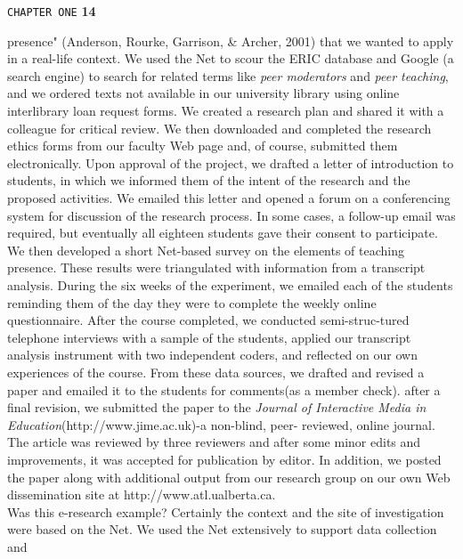 \documentclass{book}
\begin{document}
\begin{flushright}
\texttt{CHAPTER ONE}
\hspace*{0.5cm}
\textbf{14}
\end{flushright}
\vspace*{0.7cm}
presence" (Anderson, Rourke, Garrison, & Archer, 2001) that we wanted to apply in a
real-life context. We used the Net to scour the ERIC database and Google (a search
engine) to search for related terms like \emph{peer moderators} and \emph{peer teaching}, and we ordered
texts not available in our university library using online interlibrary loan request forms.
We created a research plan and shared it with a colleague for critical review. We then
downloaded and completed the research ethics forms from our faculty Web page and, of
course, submitted them electronically. Upon approval of the project, we drafted a letter of
introduction to students, in which we informed them of the intent of the research and the
proposed activities. We emailed this letter and opened a forum on a conferencing system
for discussion of the research process. In some cases, a follow-up email was required, but
eventually all eighteen students gave their consent to participate. We then developed a
short Net-based survey on the elements of teaching presence. These results were triangulated
with information from a transcript analysis. During the six weeks of the experiment,
we emailed each of the students reminding them of the day they were to complete
the weekly online questionnaire. After the course completed, we conducted semi-struc-tured
telephone interviews with a sample of the students, applied our transcript analysis
instrument with two independent coders, and reflected on our own experiences of the
course. From these data sources, we drafted and revised a paper and emailed it to the
students for comments(as a member check). after a final revision, we submitted the paper to
the \emph{Journal of Interactive Media in Education}(http://www.jime.ac.uk)-a non-blind, peer-
reviewed, online journal. The article was reviewed by three reviewers and after some
minor edits and improvements, it was accepted for publication by editor. In addition,
we posted the paper along with additional output from our research group on our own
Web dissemination site at http://www.atl.ualberta.ca.
\\\hspace*{0.5cm}Was this e-research example? Certainly the context and the site of investigation
were based on the Net. We used the Net extensively to support data collection and
\end{document}
